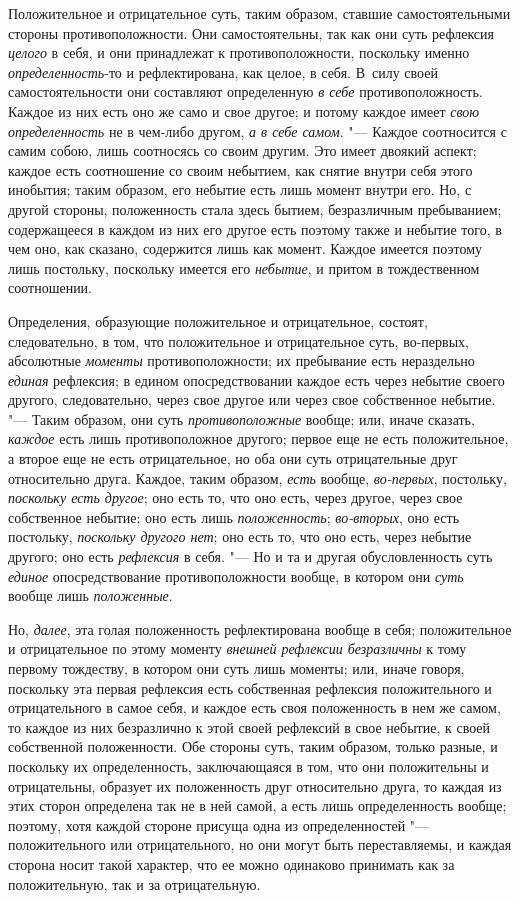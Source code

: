 Положительное и отрицательное суть, таким образом, ставшие самостоятельными
стороны противоположности. Они самостоятельны, так как они суть рефлексия
{\em целого} в себя, и они принадлежат к
противоположности, поскольку именно
{\em определенность}-то и рефлектирована, как целое,
в себя. В~силу своей самостоятельности они составляют определенную
{\em в себе} противоположность. Каждое из них есть оно
же само и свое другое; и потому каждое имеет {\em свою
определенность} не в чем-либо другом, {\em а в себе
самом}. "--- Каждое соотносится с самим собою, лишь соотносясь со своим
другим. Это имеет двоякий аспект; каждое есть соотношение со своим
небытием, как снятие внутри себя этого инобытия; таким образом, его небытие
есть лишь момент внутри его. Но, с другой стороны, положенность стала здесь
бытием, безразличным пребыванием; содержащееся в каждом из них его другое
есть поэтому также и небытие того, в чем оно, как сказано, содержится лишь
как момент. Каждое имеется поэтому лишь постольку, поскольку имеется его
{\em небытие}, и притом в тождественном соотношении.

Определения, образующие положительное и отрицательное, состоят,
следовательно, в том, что положительное и отрицательное суть, во-первых,
абсолютные {\em моменты} противоположности; их
пребывание есть нераздельно {\em единая} рефлексия; в
едином опосредствовании каждое есть через небытие своего другого,
следовательно, через свое другое или через свое собственное небытие. "---
Таким образом, они суть {\em противоположные} вообще;
или, иначе сказать, {\em каждое} есть лишь
противоположное другого; первое еще не есть положительное, а второе еще не
есть отрицательное, но оба они суть отрицательные друг относительно друга.
Каждое, таким образом, {\em есть} вообще,
{\em во-первых}, постольку,
{\em поскольку есть другое}; оно есть то, что оно есть,
через другое, через свое собственное небытие; оно есть лишь
{\em положенность}; {\em во-вторых}, оно есть постольку,
{\em поскольку другого нет}; оно есть то, что оно есть,
через небытие другого; оно есть {\em рефлексия} в себя.
"--- Но и та и другая обусловленность суть {\em единое}
опосредствование противоположности вообще, в котором они
{\em суть} вообще лишь {\em положенные}.

Но, {\em далее}, эта голая положенность рефлектирована
вообще в себя; положительное и отрицательное по этому моменту
{\em внешней рефлексии безразличны} к тому первому
тождеству, в котором они суть лишь моменты; или, иначе говоря, поскольку
эта первая рефлексия есть собственная рефлексия положительного и
отрицательного в самое себя, и каждое есть своя положенность в нем же
самом, то каждое из них безразлично к этой своей рефлексий в свое небытие,
к своей собственной положенности. Обе стороны суть, таким образом, только
разные, и поскольку их определенность, заключающаяся в том, что они
положительны и отрицательны, образует их положенность друг относительно
друга, то каждая из этих сторон определена так не в ней самой, а есть лишь
определенность вообще; поэтому, хотя каждой стороне присуща одна из
определенностей "--- положительного или отрицательного, но они могут быть
переставляемы, и каждая сторона носит такой характер, что ее можно
одинаково принимать как за положительную, так и за отрицательную.

